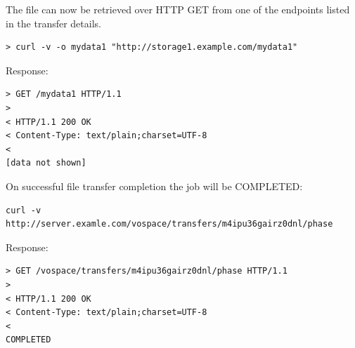 \documentclass[11pt,a4paper]{ivoa}
\begin{document}
The file can now be retrieved over HTTP GET from one of the endpoints listed in the transfer details.
\begin{lstlisting}
> curl -v -o mydata1 "http://storage1.example.com/mydata1"
\end{lstlisting}
Response:
\begin{lstlisting}
> GET /mydata1 HTTP/1.1
>
< HTTP/1.1 200 OK
< Content-Type: text/plain;charset=UTF-8
<
[data not shown]
\end{lstlisting}
On successful file transfer completion the job will be COMPLETED:
\begin{lstlisting}
curl -v http://server.examle.com/vospace/transfers/m4ipu36gairz0dnl/phase
\end{lstlisting}
Response:
\begin{lstlisting}
> GET /vospace/transfers/m4ipu36gairz0dnl/phase HTTP/1.1
>
< HTTP/1.1 200 OK
< Content-Type: text/plain;charset=UTF-8
<
COMPLETED
\end{lstlisting}
\end{document}
